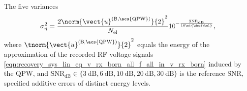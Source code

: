 The five variances
\begin{equation}
  \sigma_{\eta}^{2}
  =
  \frac{
    2
    \norm{ \vect{u}^{(\text{B}, \text{\acs{QPW}})} }{2}^{2}
  }{
    N_{\text{el}}
  }
  10^{ -\frac{ \text{SNR}_{\text{dB}} }{ 10 \si{\deci\bel} } },
 \label{eqn:sim_study_params_obs_errors_variance}
\end{equation}
where
$\tnorm{ \vect{u}^{(\text{B}, \text{\acs{QPW}})} }{2}^{2}$ equals
the energy of
the  approximation of
the recorded \ac{RF} voltage signals
\eqref{eqn:recovery_sys_lin_eq_v_rx_born_all_f_all_in_v_rx_born} induced by
the \ac{QPW}, and
$\text{SNR}_{\text{dB}} \in \{ \SI{3}{\deci\bel}, \SI{6}{\deci\bel}, \SI{10}{\deci\bel}, \SI{20}{\deci\bel}, \SI{30}{\deci\bel} \}$ is
the reference \ac{SNR}, specified
additive errors of
distinct energy levels.
